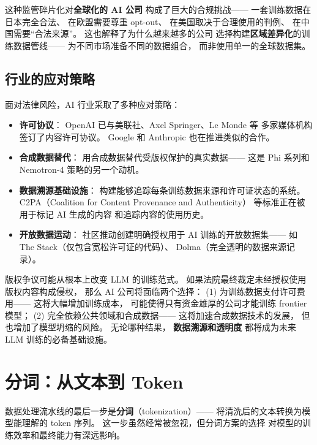 这种监管碎片化对\textbf{全球化的 AI 公司}
构成了巨大的合规挑战——
一套训练数据在日本完全合法、
在欧盟需要尊重 opt-out、
在美国取决于合理使用的判例、
在中国需要``合法来源''。
这也解释了为什么越来越多的公司
选择构建\textbf{区域差异化}的训练数据管线——
为不同市场准备不同的数据组合，
而非使用单一的全球数据集。

\subsection{行业的应对策略}

面对法律风险，AI 行业采取了多种应对策略：

\begin{itemize}[noitemsep]
  \item \textbf{许可协议}：
        OpenAI 已与美联社、Axel Springer、Le Monde 等
        多家媒体机构签订了内容许可协议。
        Google 和 Anthropic 也在推进类似的合作。
  \item \textbf{合成数据替代}：
        用合成数据替代受版权保护的真实数据——
        这是 Phi 系列和 Nemotron-4 策略的另一个动机。
  \item \textbf{数据溯源基础设施}：
        构建能够追踪每条训练数据来源和许可证状态的系统。
        C2PA（Coalition for Content Provenance and Authenticity）
        等标准正在被用于标记 AI 生成的内容
        和追踪内容的使用历史。
  \item \textbf{开放数据运动}：
        社区推动创建明确授权用于 AI 训练的开放数据集——
        如 The Stack（仅包含宽松许可证的代码）、
        Dolma（完全透明的数据来源记录）。
\end{itemize}

\begin{corebox}[版权问题的长期影响]
版权争议可能从根本上改变 LLM 的训练范式。
如果法院最终裁定未经授权使用版权内容构成侵权，
那么 AI 公司将面临两个选择：
(1) 为训练数据支付许可费用——
这将大幅增加训练成本，
可能使得只有资金雄厚的公司才能训练 frontier 模型；
(2) 完全依赖公共领域和合成数据——
这将加速合成数据技术的发展，
但也增加了模型坍缩的风险。
无论哪种结果，
\textbf{数据溯源和透明度}
都将成为未来 LLM 训练的必备基础设施。
\end{corebox}

\section{分词：从文本到 Token}

数据处理流水线的最后一步是\textbf{分词}（tokenization）——
将清洗后的文本转换为模型能理解的 token 序列。
这一步虽然经常被忽视，但分词方案的选择
对模型的训练效率和最终能力有深远影响。

